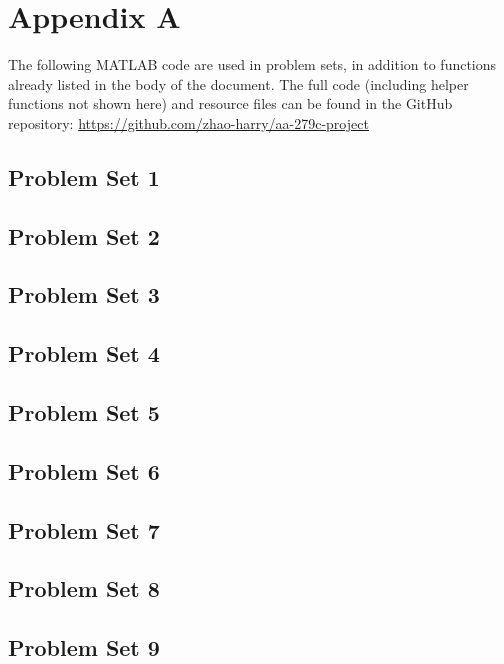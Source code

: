 \appendix

\section{Appendix A}
The following MATLAB code are used in problem sets, in addition to functions already listed in the body of the document. The full code (including helper functions not shown here) and resource files can be found in the GitHub repository: \url{https://github.com/zhao-harry/aa-279c-project}

\subsection{Problem Set 1}


\newpage
\subsection{Problem Set 2}








\newpage
\subsection{Problem Set 3}



\newpage
\subsection{Problem Set 4}


\newpage
\subsection{Problem Set 5}







\newpage
\subsection{Problem Set 6}


\newpage
\subsection{Problem Set 7}


\newpage
\subsection{Problem Set 8}


\newpage
\subsection{Problem Set 9}
